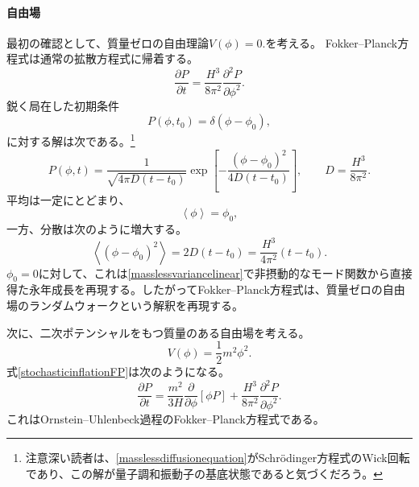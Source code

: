 \documentclass[a4paper,11pt,oneside]{article}
\theoremstyle{definition}
\numberwithin{equation}{section}
\begin{document}
\paragraph{自由場}



最初の確認として、質量ゼロの自由理論\(
V(\phi)
=
0.
\)を考える。
Fokker--Planck方程式は通常の拡散方程式に帰着する。
\begin{equation}
\frac{\partial P}{\partial t}
=
\frac{H^{3}}{8\pi^{2}}
\frac{\partial^{2}P}{\partial\phi^{2}}.
\label{masslessdiffusionequation}
\end{equation}
鋭く局在した初期条件
\begin{equation}
P(\phi,t_{0})
=
\delta(\phi-\phi_{0}),
\end{equation}
に対する解は次である。\footnote{注意深い読者は、\eqref{masslessdiffusionequation}がSchr\"odinger方程式のWick回転であり、この解が量子調和振動子の基底状態であると気づくだろう。}
\begin{equation}
P(\phi,t)
=
\frac{1}{
\sqrt{
4\pi D(t-t_{0})
}
}
\exp\left[
-
\frac{
(\phi-\phi_{0})^{2}
}{
4D(t-t_{0})
}
\right],
\qquad
D
=
\frac{H^{3}}{8\pi^{2}}.
\label{masslessGaussianP}
\end{equation}
平均は一定にとどまり、
\begin{equation}
\left\langle
\phi
\right\rangle
=
\phi_{0},
\end{equation}
一方、分散は次のように増大する。
\begin{equation}
\left\langle
(\phi-\phi_{0})^{2}
\right\rangle
=
2D(t-t_{0})
=
\frac{H^{3}}{4\pi^{2}}
(t-t_{0}).
\label{masslessFPvariance}
\end{equation}
\(\phi_{0}=0\)に対して、これは\eqref{masslessvariancelinear}で非摂動的なモード関数から直接得た永年成長を再現する。したがってFokker--Planck方程式は、質量ゼロの自由場のランダムウォークという解釈を再現する。



次に、二次ポテンシャルをもつ質量のある自由場を考える。
\begin{equation}
V(\phi)
=
\frac{1}{2}m^{2}\phi^{2}.
\end{equation}
式\eqref{stochasticinflationFP}は次のようになる。
\begin{equation}
\frac{\partial P}{\partial t}
=
\frac{m^{2}}{3H}
\frac{\partial}{\partial\phi}
\left[
\phi P
\right]
+
\frac{H^{3}}{8\pi^{2}}
\frac{\partial^{2}P}{\partial\phi^{2}}.
\label{massiveOrnsteinUhlenbeck}
\end{equation}
これはOrnstein--Uhlenbeck過程のFokker--Planck方程式である。
\end{document}
